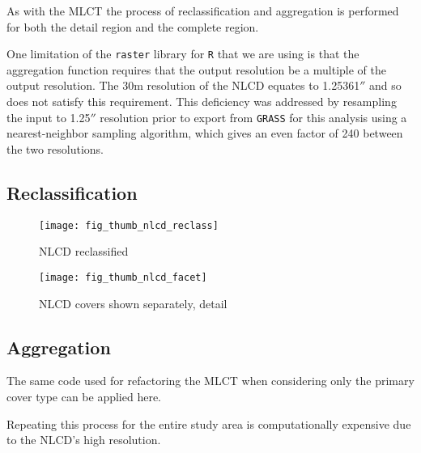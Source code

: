 As with the MLCT the process of reclassification and aggregation is
performed for both the detail region and the complete region.

One limitation of the \texttt{raster} library for \texttt{R} that we
are using is that the aggregation function requires that the output
resolution be a multiple of the output resolution.  The 30m resolution
of the NLCD equates to 1.25361$''$ and so does not satisfy this
requirement.  This deficiency was addressed by resampling the input to
1.25$''$ resolution prior to export from \texttt{GRASS} for this
analysis using a nearest-neighbor sampling algorithm, which gives an
even factor of 240 between the two resolutions.



\subsection{Reclassification}
\label{sec:nlcd-reclass}



\begin{figure}[hpt] 
\begin{center}


\texttt{[image: fig\_thumb\_nlcd\_reclass]}
\end{center} 
\caption{NLCD reclassified} 
\label{fig:thumb_nlcd_reclass} 
\end{figure} 

\begin{figure}[hpt] 
\begin{center}
  

\texttt{[image: fig\_thumb\_nlcd\_facet]}
\end{center} 
\caption{NLCD covers shown separately, detail} 
\label{fig:thumb_nlcd_facet} 
\end{figure} 

\subsection{Aggregation}
\label{sec:nlcd-aggr}

The same code used for refactoring the MLCT when considering only the
primary cover type can be applied here.

Repeating this process for the entire study area is computationally
expensive due to the NLCD's high resolution.


